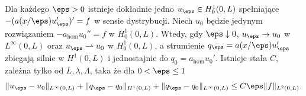 \begin{twierdzenie}\label{thm:pde30-1d}
Dla każdego $\eps>0$ istnieje dokładnie jedno $u_\eps\in H_0^1(0,L)$
spełniające $-(a(x/\eps)u_\eps')'=f$ w sensie dystrybucji.
Niech $u_0$ będzie jedynym rozwiązaniem
$-a_{\mathrm{hom}}u_0''=f$ w $H_0^1(0,L)$.
Wtedy, gdy $\eps\downarrow0$,
$u_\eps\to u_0$ w $L^\infty(0,L)$ oraz
$u_\eps\rightharpoonup u_0$ w $H_0^1(0,L)$, a strumienie
$q_\eps=a(x/\eps)u_\eps'$ zbiegają silnie w $H^1(0,L)$
i jednostajnie do $q_0=a_{\mathrm{hom}}u_0'$. Istnieje stała $C$, zależna tylko od
$L,\lambda,\Lambda$, taka że dla $0<\eps\le1$
\begin{equation}\label{eq:pde30-1d-rate}
 \|u_\eps-u_0\|_{L^\infty(0,L)}
 +\|q_\eps-q_0\|_{H^1(0,L)}
 +\|q_\eps-q_0\|_{L^\infty(0,L)}
 \le C\eps\|f\|_{L^2(0,L)}.
\end{equation}
\end{twierdzenie}
